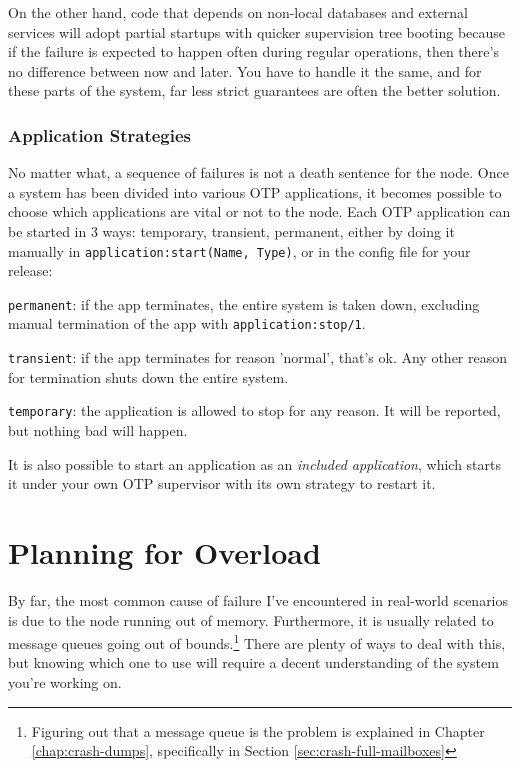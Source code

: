 \documentclass[11pt, oneside]{book}   	%
\newcommand{\function}[1]{\Verb`#1`}
\newcommand{\expression}[1]{\Verb`#1`}
\newcommand{\term}[1]{\Verb`#1`}
\begin{document}
On the other hand, code that depends on non-local databases and external services will adopt partial startups with quicker supervision tree booting because if the failure is expected to happen often during regular operations,
then there's no difference between now and later. You have to handle it the same, and for these parts of the system, far less strict guarantees are often the better solution.

\subsection{Application Strategies}
\label{subsec:start-link-application-strategies}

No matter what, a sequence of failures is not a death sentence for the node. Once a system has been divided into various OTP applications, it becomes possible to choose which applications are vital or not to the node. Each OTP application can be started in 3 ways: temporary, transient, permanent, either by doing it manually in \expression{application:start(Name, Type)}, or in the config file for your release:

\begin{itemize*}
	\item \term{permanent}: if the app terminates, the entire system is taken down, excluding manual termination of the app with \function{application:stop/1}.
	\item \term{transient}: if the app terminates for reason 'normal', that's ok. Any other reason for termination shuts down the entire system.
	\item \term{temporary}: the application is allowed to stop for any reason. It will be reported, but nothing bad will happen.
\end{itemize*}

It is also possible to start an application as an \emph{included application}, which starts it under your own OTP supervisor with its own strategy to restart it.


\chapter{Planning for Overload}
\label{chap:overload}

By far, the most common cause of failure I've encountered in real-world scenarios is due to the node running out of memory. Furthermore, it is usually related to message queues going out of bounds.\footnote{Figuring out that a message queue is the problem is explained in Chapter \ref{chap:crash-dumps}, specifically in Section \ref{sec:crash-full-mailboxes}} There are plenty of ways to deal with this, but knowing which one to use will require a decent understanding of the system you're working on.
\end{document}
